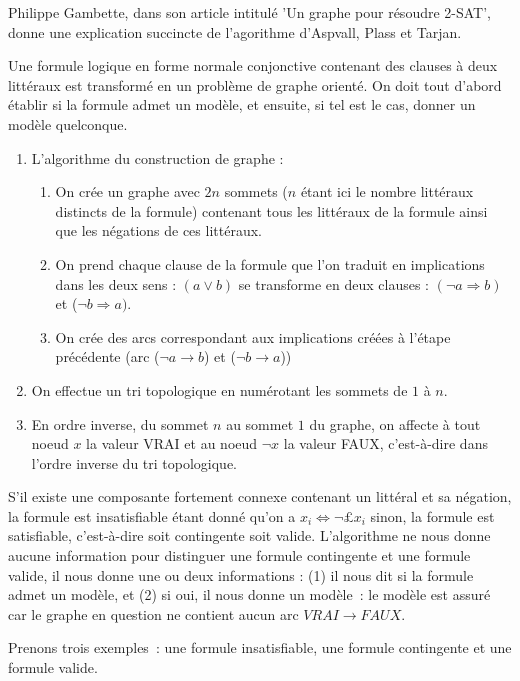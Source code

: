 \documentclass{article}
\begin{document}
Philippe Gambette, dans son article intitulé 'Un graphe pour résoudre 2-SAT', donne une explication succincte de l'agorithme d'Aspvall, Plass et Tarjan.

Une formule logique en forme normale conjonctive contenant des clauses à deux littéraux est transformé en un problème de graphe orienté. On doit tout d'abord établir si la formule admet un modèle, et ensuite, si tel est le cas, donner un modèle quelconque.

\begin{enumerate}
\item L'algorithme du construction de graphe : 
\begin{enumerate}
\item On crée un graphe avec $2n$ sommets ($n$ étant ici le nombre littéraux distincts de la formule) contenant tous les littéraux de la formule ainsi que les négations de ces littéraux.
\item On prend chaque clause de la formule que l'on traduit en implications dans les deux sens : $(a \vee b)$ 
se transforme en deux clauses : $(\neg a \Rightarrow b)$ et ($\neg b \Rightarrow a)$.
\item On crée des arcs correspondant aux implications créées à l'étape précédente (arc ($\neg a 
\rightarrow b$) et ($\neg b \rightarrow a$))
\end{enumerate}
\item On effectue un tri topologique en numérotant les sommets de $1$ à $n$.
\item En ordre inverse, du sommet $n$ au sommet $1$ du graphe, on affecte à tout noeud $x$ la valeur VRAI et au noeud $\neg x$ la valeur FAUX, c'est-à-dire dans l'ordre inverse du tri topologique.
\end{enumerate}  	

S'il existe une composante fortement connexe contenant un littéral et sa négation, la formule est insatisfiable étant donné qu'on a $x_{i} \Leftrightarrow \neg £x_{i}$ sinon, la formule est satisfiable, c'est-à-dire soit contingente soit valide. L'algorithme ne nous donne aucune information pour distinguer une formule contingente et une formule valide, il nous donne une ou deux informations : (1) il nous dit si la formule admet un modèle, et (2) si oui, il nous donne un modèle~: le modèle est assuré car le graphe en question ne contient aucun arc $VRAI \rightarrow FAUX$.

Prenons trois exemples~: une formule insatisfiable, une formule contingente et une formule valide.
\end{document}
